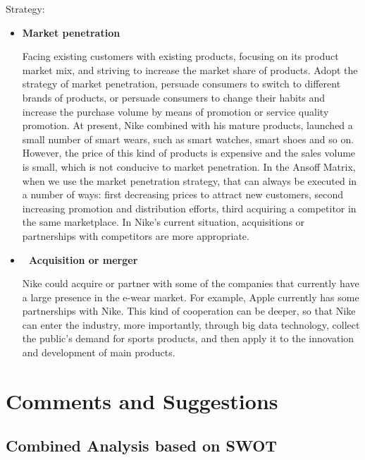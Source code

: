 \documentclass[a4paper, 12pt]{report}
\begin{document}
Strategy:
\begin{itemize}
    \item \textbf{Market penetration} \par Facing existing customers with existing products, focusing on its product market mix, and striving to increase the market share of products. Adopt the strategy of market penetration, persuade consumers to switch to different brands of products, or persuade consumers to change their habits and increase the purchase volume by means of promotion or service quality promotion. At present, Nike combined with his mature products, launched a small number of smart wears, such as smart watches, smart shoes and so on. However, the price of this kind of products is expensive and the sales volume is small, which is not conducive to market penetration. In the Ansoff Matrix, when we use the market penetration strategy, that can always be executed in a number of ways: first decreasing prices to attract new customers, second increasing promotion and distribution efforts, third acquiring a competitor in the same marketplace. In Nike's current situation, acquisitions or partnerships with competitors are more appropriate.
    \item \textbf{	Acquisition or merger} \par Nike could acquire or partner with some of the companies that currently have a large presence in the e-wear market. For example, Apple currently has some partnerships with Nike. This kind of cooperation can be deeper, so that Nike can enter the industry, more importantly, through big data technology, collect the public's demand for sports products, and then apply it to the innovation and development of main products.
    
\end{itemize}
\chapter{Comments and Suggestions}
\section{Combined Analysis based on SWOT}
\end{document}
